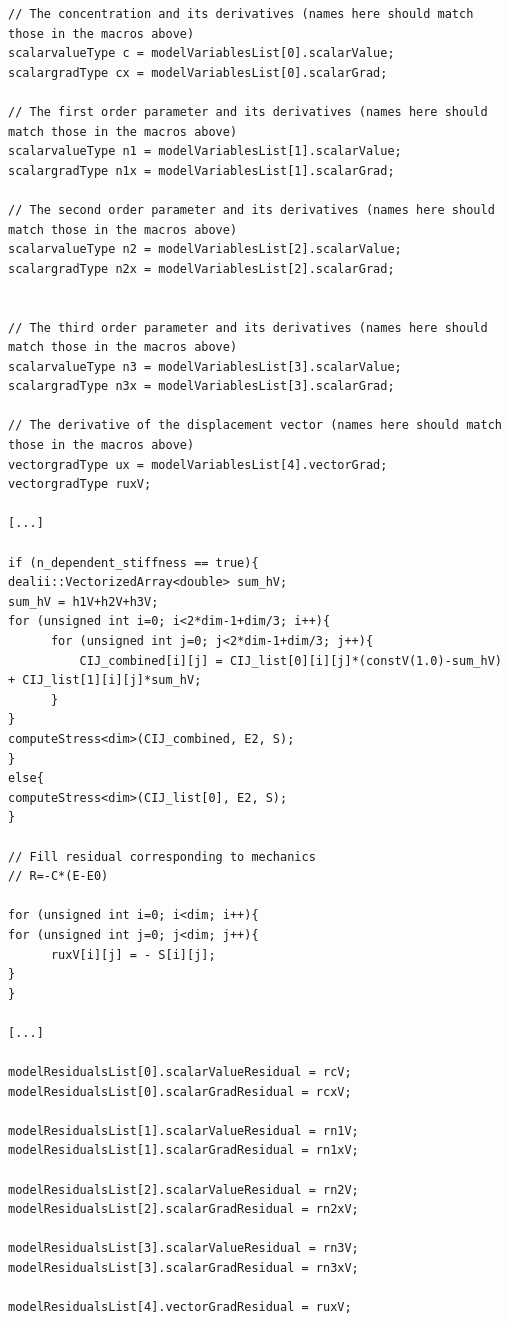 \documentclass[10pt]{article} %
\begin{document}
\begin{lstlisting}
// The concentration and its derivatives (names here should match those in the macros above)
scalarvalueType c = modelVariablesList[0].scalarValue;
scalargradType cx = modelVariablesList[0].scalarGrad;

// The first order parameter and its derivatives (names here should match those in the macros above)
scalarvalueType n1 = modelVariablesList[1].scalarValue;
scalargradType n1x = modelVariablesList[1].scalarGrad;

// The second order parameter and its derivatives (names here should match those in the macros above)
scalarvalueType n2 = modelVariablesList[2].scalarValue;
scalargradType n2x = modelVariablesList[2].scalarGrad;


// The third order parameter and its derivatives (names here should match those in the macros above)
scalarvalueType n3 = modelVariablesList[3].scalarValue;
scalargradType n3x = modelVariablesList[3].scalarGrad;

// The derivative of the displacement vector (names here should match those in the macros above)
vectorgradType ux = modelVariablesList[4].vectorGrad;
vectorgradType ruxV;

[...]

if (n_dependent_stiffness == true){
dealii::VectorizedArray<double> sum_hV;
sum_hV = h1V+h2V+h3V;
for (unsigned int i=0; i<2*dim-1+dim/3; i++){
	  for (unsigned int j=0; j<2*dim-1+dim/3; j++){
		  CIJ_combined[i][j] = CIJ_list[0][i][j]*(constV(1.0)-sum_hV) + CIJ_list[1][i][j]*sum_hV;
	  }
}
computeStress<dim>(CIJ_combined, E2, S);
}
else{
computeStress<dim>(CIJ_list[0], E2, S);
}

// Fill residual corresponding to mechanics
// R=-C*(E-E0)

for (unsigned int i=0; i<dim; i++){
for (unsigned int j=0; j<dim; j++){
	  ruxV[i][j] = - S[i][j];
}
}

[...]

modelResidualsList[0].scalarValueResidual = rcV;
modelResidualsList[0].scalarGradResidual = rcxV;

modelResidualsList[1].scalarValueResidual = rn1V;
modelResidualsList[1].scalarGradResidual = rn1xV;

modelResidualsList[2].scalarValueResidual = rn2V;
modelResidualsList[2].scalarGradResidual = rn2xV;

modelResidualsList[3].scalarValueResidual = rn3V;
modelResidualsList[3].scalarGradResidual = rn3xV;

modelResidualsList[4].vectorGradResidual = ruxV;


\end{lstlisting}
\end{document}
